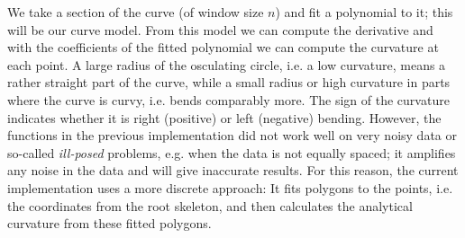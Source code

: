 

We  take a section of the curve (of window size \(n\)) and fit a polynomial to it; this will be our curve model. From this model we can compute the derivative and with the coefficients of the fitted polynomial we can compute the curvature at each point. 
A large radius of the osculating circle, i.e. a low curvature, means a rather straight part of the curve, while a small radius or high curvature in parts where the curve is curvy, i.e. bends comparably more. The sign of the curvature indicates whether it is right (positive) or left (negative) bending. However, the 
functions in the previous implementation did not work well on very noisy data or so-called \textit{ill-posed} problems, e.g. when the data is not equally spaced; %
it amplifies any noise in the data and will give inaccurate results.
For this reason, the current implementation uses a more discrete approach: It fits polygons to the points, i.e. the coordinates from the root skeleton, and then calculates the analytical curvature from these fitted polygons. 



%


